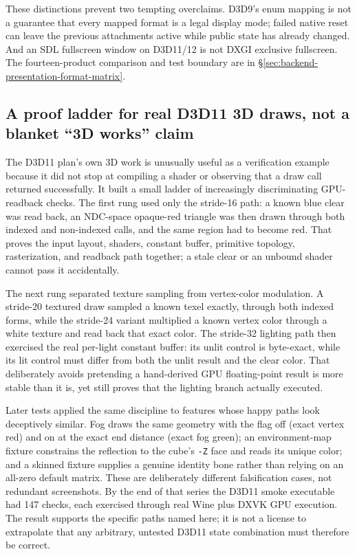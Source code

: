 These distinctions prevent two tempting overclaims. D3D9's enum mapping is not a guarantee
that every mapped format is a legal display mode; failed native reset can leave the previous
attachments active while public state has already changed. And an SDL fullscreen window on
D3D11/12 is not DXGI exclusive fullscreen. The fourteen-product comparison and test boundary
are in \S\ref{sec:backend-presentation-format-matrix}.

\subsection{A proof ladder for real D3D11 3D draws, not a blanket ``3D works'' claim}

The D3D11 plan's own 3D work is unusually useful as a verification example because it did not
stop at compiling a shader or observing that a draw call returned successfully.  It built a
small ladder of increasingly discriminating GPU-readback checks.  The first rung used only the
stride-16  path: a known blue clear was read back, an NDC-space
opaque-red triangle was then drawn through both indexed and non-indexed calls, and the same
region had to become red.  That proves the input layout, shaders, constant buffer, primitive
topology, rasterization, and readback path together; a stale clear or an unbound shader cannot
pass it accidentally.

The next rung separated texture sampling from vertex-color modulation.  A stride-20 textured
draw sampled a known texel exactly, through both indexed forms, while the stride-24 variant
multiplied a known vertex color through a white texture and read back that exact color.  The
stride-32 lighting path then exercised the real per-light constant buffer: its unlit control is
byte-exact, while its lit control must differ from both the unlit result and the clear color.
That deliberately avoids pretending a hand-derived GPU floating-point result is more stable
than it is, yet still proves that the lighting branch actually executed.

Later tests applied the same discipline to features whose happy paths look deceptively similar.
Fog draws the same geometry with the flag off (exact vertex red) and on at the exact end distance
(exact fog green); an environment-map fixture constrains the reflection to the cube's \texttt{-Z}
face and reads its unique color; and a skinned fixture supplies a genuine identity bone rather
than relying on an all-zero default matrix.  These are deliberately different falsification
cases, not redundant screenshots.  By the end of that series the D3D11 smoke executable had
147 checks, each exercised through real Wine plus DXVK GPU execution.  The result supports the
specific paths named here; it is not a license to extrapolate that any arbitrary, untested
D3D11 state combination must therefore be correct.

